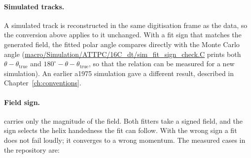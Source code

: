 \paragraph{Simulated tracks.} A simulated track is reconstructed in the same digitisation frame as the data, so the
conversion above applies to it unchanged. With a fit sign that matches the generated field, the fitted polar angle
compares directly with the Monte Carlo angle (\url{macro/Simulation/ATTPC/16C_dt/sim_fit_sign_check.C} prints both
$\theta-\theta_\mathrm{true}$ and $180^\circ-\theta-\theta_\mathrm{true}$, so that the relation can be measured for a new
simulation). An earlier a1975 simulation gave a different result, described in Chapter~\ref{ch:conventions}.

\paragraph{Field sign.}  carries only the magnitude of the field. Both fitters take a signed field, and
the sign selects the helix handedness the fit can follow. With the wrong sign a fit does not fail loudly; it converges
to a wrong momentum. The measured cases in the repository are:

